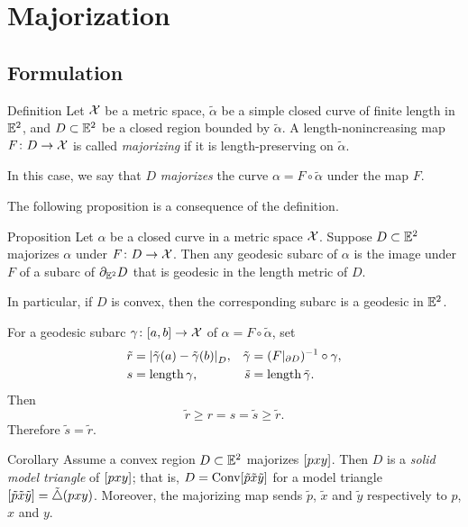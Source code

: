 \chapter{Majorization}\label{sec:resh-kirz}

\section{Formulation}

\begin{thm}{Definition}\label{def:majorize}
Let $\mathcal{X}$ be a metric space,
$\tilde \alpha$ be a simple closed curve of finite length  in $\mathbb{E}^2$,
and $D\subset\mathbb{E}^2$ be a closed region bounded by $\tilde \alpha$.
A length-nonincreasing map $F\colon D\to\mathcal{X}$ is called \emph{majorizing} if it is length-preserving on $\tilde \alpha$.

In this case, we say that $D$ \emph{majorizes} the curve $\alpha=F\circ\tilde \alpha$ under the map $F$.
\end{thm}

The following proposition is a consequence of the definition.

\begin{thm}{Proposition}
\label{prop:majorize-geodesic} 
Let  $\alpha$  be a closed curve in a metric space $\mathcal{X}$.
Suppose $D\subset\mathbb{E}^2$ majorizes $\alpha$ under $F\colon D \to \mathcal{X}$.  
Then any geodesic subarc of $\alpha$ is the image under $F$ of a subarc of $\partial_{\mathbb{E}^2} D$ that is geodesic in the length metric of $D$.

In particular, if $D$ is convex, then the corresponding subarc is a geodesic in $\mathbb{E}^2$.
\end{thm}

 For a geodesic subarc $\gamma\colon[a,b]\to\mathcal{X}$ of $\alpha=F\circ\tilde \alpha$, set
\begin{align*}
\tilde r&=\dist{\tilde \gamma(a)}{\tilde \gamma(b)}{D},
&
\tilde \gamma &= (F|_{\partial D})^{-1}\circ\gamma,
\\
s&=\length \gamma,
&
\tilde s&= \length \tilde \gamma.
\end{align*}
Then
\[\tilde r\ge r = s =\tilde s\ge\tilde r.\]
Therefore $\tilde s=\tilde r$.
\qeds

\begin{thm}{Corollary}\label{cor:maj-triangle}
 Assume a convex region $D\subset \mathbb{E}^2$ majorizes $[pxy]$.
Then $D$ is a \emph{solid model triangle} of $[pxy]$;
that is,
$D=\mathop{\rm Conv}\nolimits[\tilde p\tilde x\tilde y]$ for a model triangle $[\tilde p\tilde x\tilde y]=\tilde\triangle(p x y)$.
Moreover, the majorizing map sends  $\tilde p$, $\tilde x$ and $\tilde y$ respectively to $p$, $x$ and $y$.
\end{thm}

